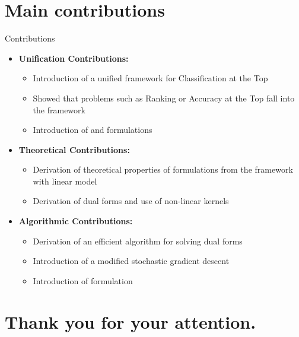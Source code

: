\documentclass[10pt, aspectratio=169]{beamer}
\begin{document}
\section{Main contributions}

\begin{frame}{Contributions}
  \begin{itemize}
    \item \textbf{Unification Contributions:}
    \begin{itemize}
      \item Introduction of a unified framework for Classification at the Top
      \item Showed that problems such as Ranking or Accuracy at the Top fall into the framework
      \item Introduction of \PatMat and \PatMatNP formulations
    \end{itemize}
    \item \textbf{Theoretical Contributions:}
    \begin{itemize}      
      \item Derivation of theoretical properties of formulations from the framework with linear model
      \item Derivation of dual forms and use of non-linear kernels
    \end{itemize}
    \item \textbf{Algorithmic Contributions:}
    \begin{itemize}
      \item Derivation of an efficient algorithm for solving dual forms
      \item Introduction of a modified stochastic gradient descent
      \item Introduction of \DeepTopPush formulation
    \end{itemize}
  \end{itemize}
\end{frame}

\section{Thank you for your attention.}
\end{document}
